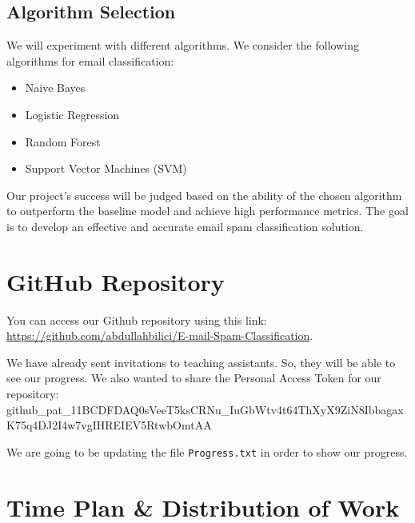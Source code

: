 \documentclass[conference]{IEEEtran}
\begin{document}
\subsection{Algorithm Selection} We will experiment with different algorithms. We consider the following algorithms for email classification:

\begin{itemize}
    \item Naive Bayes
    \item Logistic Regression
    \item Random Forest
    \item Support Vector Machines (SVM)
\end{itemize}

Our project's success will be judged based on the ability of the chosen algorithm to outperform the baseline model and achieve high performance metrics. The goal is to develop an effective and accurate email spam classification solution.

\section{GitHub Repository}
You can access our Github repository using this link: \href{https://github.com/abdullahbilici/E-mail-Spam-Classification}{https://github.com/abdullahbilici/E-mail-Spam-Classification}.

We have already sent invitations to teaching assistants. So, they will be able to see our progress. We also wanted to share the Personal Access Token for our repository: {\tiny github\_pat\_11BCDFDAQ0sVeeT5ksCRNu\_IuGbWtv4t64ThXyX9ZiN8IbbagaxK75q4DJ2I4w7vgIHREIEV5RtwbOmtAA}

We are going to be updating the file \verb|Progress.txt| in order to show our progress.

\section{Time Plan \& Distribution of Work}
\end{document}
